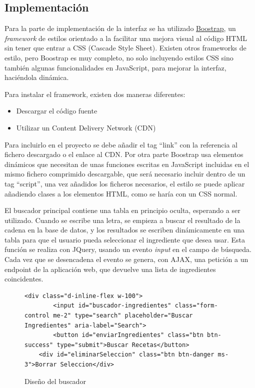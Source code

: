 \subsection{Implementación}
Para la parte de implementación de la interfaz se ha utilizado \href{https://getbootstrap.com/}{Boostrap}, un \emph{\gls{framework}} de estilos orientado a la facilitar una mejora visual al código \gls{HTML} sin tener que entrar a \gls{CSS} (Cascade Style Sheet). Existen otros \glspl{framework} de estilo, pero Boostrap es muy completo, no solo incluyendo estilos \gls{CSS} sino también algunas funcionalidades en JavaScript, para mejorar la interfaz, haciéndola dinámica.

Para instalar el \gls{framework}, existen dos maneras diferentes:
\begin{itemize}
    \item Descargar el código fuente
    \item Utilizar un Content Delivery Network (\gls{CDN})
\end{itemize}

Para incluirlo en el proyecto se debe añadir el \gls{tag} ``link'' con la referencia al fichero descargado o el enlace al \gls{CDN}. Por otra parte Boostrap usa elementos dinámicos que necesitan de unas funciones escritas en JavaScript incluidas en el mismo fichero comprimido descargable, que será necesario incluir dentro de un \gls{tag} ``script'', una vez añadidos los ficheros necesarios, el estilo se puede aplicar añadiendo clases a los elementos \gls{HTML}, como se haría con un \gls{CSS} normal.

El buscador principal contiene una tabla en principio oculta, esperando a ser utilizado. Cuando se escribe una letra, se empieza a buscar el resultado de la cadena en la base de datos, y los resultados se escriben dinámicamente en una tabla para que el usuario pueda seleccionar el ingrediente que desea usar. Esta función se realiza con \gls{JQuery}, usando un evento \textit{input} en el campo de búsqueda. Cada vez que se desencadena el evento se genera, con \gls{AJAX}, una petición a un \gls{endpoint} de la aplicación web, que devuelve una lista de ingredientes coincidentes.
\begin{figure}[h!]
\centering
{}
\label{fig:buscador}
\begin{lstlisting}[style=consola]
    <div class="d-inline-flex w-100">
        <input id="buscador-ingredientes" class="form-control me-2" type="search" placeholder="Buscar Ingredientes" aria-label="Search">
        <button id="enviarIngredientes" class="btn btn-success" type="submit">Buscar Recetas</button>
    <div id="eliminarSeleccion" class="btn btn-danger ms-3">Borrar Seleccion</div>
\end{lstlisting}
\caption{Diseño del buscador}
\end{figure}

